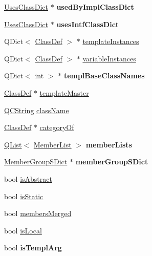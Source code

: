 \begin{DoxyCompactItemize}
\item 
\hypertarget{class_class_def_impl_a9db3634550520ac64995c06ad79ec242}{\hyperlink{class_uses_class_dict}{Uses\-Class\-Dict} $\ast$ {\bfseries used\-By\-Impl\-Class\-Dict}}\label{class_class_def_impl_a9db3634550520ac64995c06ad79ec242}

\item 
\hypertarget{class_class_def_impl_ac3a5097b8f70233e00f72bd6e5fe9cd7}{\hyperlink{class_uses_class_dict}{Uses\-Class\-Dict} $\ast$ {\bfseries uses\-Intf\-Class\-Dict}}\label{class_class_def_impl_ac3a5097b8f70233e00f72bd6e5fe9cd7}

\item 
Q\-Dict$<$ \hyperlink{class_class_def}{Class\-Def} $>$ $\ast$ \hyperlink{class_class_def_impl_ab49b6d30520603cc9c97579a168808fd}{template\-Instances}
\item 
Q\-Dict$<$ \hyperlink{class_class_def}{Class\-Def} $>$ $\ast$ \hyperlink{class_class_def_impl_a06b615e222cf24da9484fa3ebdc91e3d}{variable\-Instances}
\item 
\hypertarget{class_class_def_impl_a84139386938c73eb249976aa3f2c0595}{Q\-Dict$<$ int $>$ $\ast$ {\bfseries templ\-Base\-Class\-Names}}\label{class_class_def_impl_a84139386938c73eb249976aa3f2c0595}

\item 
\hyperlink{class_class_def}{Class\-Def} $\ast$ \hyperlink{class_class_def_impl_ab15069d1a1d6d67311966eb2fbbefd37}{template\-Master}
\item 
\hyperlink{class_q_c_string}{Q\-C\-String} \hyperlink{class_class_def_impl_aa9c1e1c77226f1a726988c0e07634265}{class\-Name}
\item 
\hyperlink{class_class_def}{Class\-Def} $\ast$ \hyperlink{class_class_def_impl_a8baa5a129ba0c7fca0f16f8941cd2572}{category\-Of}
\item 
\hypertarget{class_class_def_impl_acd7d4981c3150ba315db4421de62a103}{\hyperlink{class_q_list}{Q\-List}$<$ \hyperlink{class_member_list}{Member\-List} $>$ {\bfseries member\-Lists}}\label{class_class_def_impl_acd7d4981c3150ba315db4421de62a103}

\item 
\hypertarget{class_class_def_impl_a05e5d73660b8f595312a3bc5adb93bbe}{\hyperlink{class_member_group_s_dict}{Member\-Group\-S\-Dict} $\ast$ {\bfseries member\-Group\-S\-Dict}}\label{class_class_def_impl_a05e5d73660b8f595312a3bc5adb93bbe}

\item 
bool \hyperlink{class_class_def_impl_a8b6a66ac3f44c050d77ae0b675fe6e00}{is\-Abstract}
\item 
bool \hyperlink{class_class_def_impl_a3e1d0cb67aacaa6d9c38b825147bfe5a}{is\-Static}
\item 
bool \hyperlink{class_class_def_impl_a6501a34b597a75c28ebf096b99359b32}{members\-Merged}
\item 
bool \hyperlink{class_class_def_impl_ac605c13c815eff8fc80f638813621e24}{is\-Local}
\item 
\hypertarget{class_class_def_impl_a0f08dfd420c305d532414b5a86c9b7f6}{bool {\bfseries is\-Templ\-Arg}}\label{class_class_def_impl_a0f08dfd420c305d532414b5a86c9b7f6}


\end{DoxyCompactItemize}
